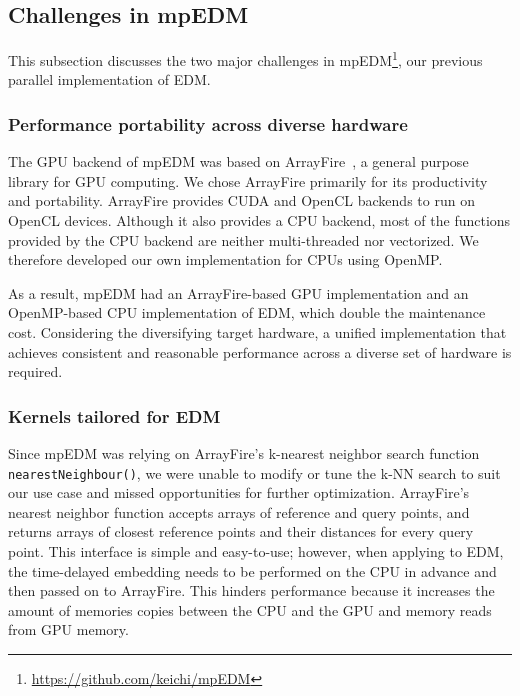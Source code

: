 \documentclass{acmart}
\begin{document}
\subsection{Challenges in mpEDM}\label{sec:challenges}

This subsection discusses the two major challenges in
mpEDM\footnote{\url{https://github.com/keichi/mpEDM}}, our previous
parallel implementation of EDM\@.

\subsubsection{Performance portability across diverse hardware}\label{sec:portability}

The GPU backend of mpEDM was based on ArrayFire~\cite{Malcolm2012}, a general
purpose library for GPU computing. We chose ArrayFire primarily for its
productivity and portability. ArrayFire provides CUDA and OpenCL backends to
run on OpenCL devices. Although it also provides a CPU backend, most of the
functions provided by the CPU backend are neither multi-threaded nor
vectorized. We therefore developed our own implementation for CPUs
using OpenMP\@.

As a result, mpEDM had an ArrayFire-based GPU implementation and an OpenMP-based
CPU implementation of EDM, which double the maintenance cost. Considering the
diversifying target hardware, a unified implementation that achieves
consistent and reasonable performance across a diverse set of hardware is
required.

\subsubsection{Kernels tailored for EDM}\label{sec:flexibility}

Since mpEDM was relying on ArrayFire's k-nearest neighbor search function \texttt{nearestNeighbour()}, we were unable to modify or tune the k-NN
search to suit our use case and missed opportunities for further optimization.
ArrayFire's nearest neighbor function accepts arrays of reference and query
points, and returns arrays of closest reference points and their distances
for every query point. This interface is simple and easy-to-use; however, when
applying to EDM, the time-delayed embedding needs to be performed on the CPU in
advance and then passed on to ArrayFire. This hinders performance because it
increases the amount of memories copies between the CPU and the
GPU and memory reads from GPU memory.
\end{document}
